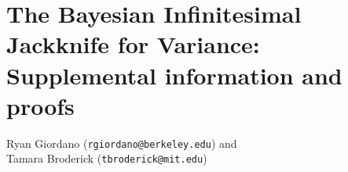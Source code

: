 \documentclass[12pt]{article} %
\begin{document}
\section*{The Bayesian Infinitesimal Jackknife for Variance: Supplemental information and proofs}

\begin{center}
    Ryan Giordano (\texttt{rgiordano@berkeley.edu})
    and\\
    Tamara Broderick (\texttt{tbroderick@mit.edu})
\end{center}

\renewcommand{\thefigure}{S\arabic{figure}}
\renewcommand{\thetable}{S\arabic{table}}
\renewcommand{\theequation}{S\arabic{equation}}
\renewcommand{\thealgorithm}{S\arabic{algorithm}}
\renewcommand{\theassu}{S\arabic{assu}}
\renewcommand{\thedefn}{S\arabic{defn}}
\renewcommand{\thelem}{S\arabic{lem}}
\renewcommand{\theex}{S\arabic{ex}}
\renewcommand{\thethm}{S\arabic{thm}}
\renewcommand{\theprop}{S\arabic{prop}}
\renewcommand{\thecor}{S\arabic{cor}}
\renewcommand{\thecond}{S\arabic{cond}}
\renewcommand{\theconj}{S\arabic{conj}}



\printbibliography{}
\end{document}
